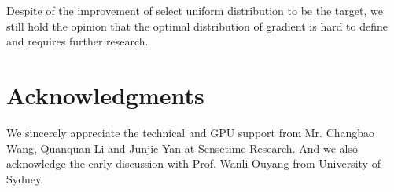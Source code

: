 \documentclass[letterpaper]{article} %
\begin{document}
Despite of the improvement of select uniform distribution to be the target, we still hold the opinion that the optimal distribution of gradient is hard to define and requires further research.


\section{Acknowledgments}
We sincerely appreciate the technical and GPU support from Mr. Changbao Wang, Quanquan Li and Junjie Yan at Sensetime Research. And we also acknowledge the early discussion with Prof. Wanli Ouyang from University of Sydney.



\end{document}
